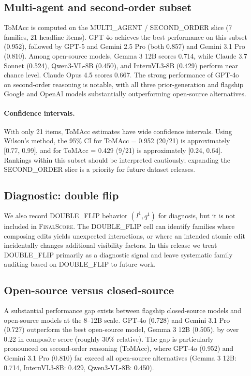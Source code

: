 \documentclass[11pt]{article}
\begin{document}
\subsection{Multi-agent and second-order subset}

ToMAcc is computed on the MULTI\_AGENT / SECOND\_ORDER slice (7 families, 21 headline items). GPT-4o achieves the best performance on this subset (0.952), followed by GPT-5 and Gemini 2.5 Pro (both 0.857) and Gemini 3.1 Pro (0.810). Among open-source models, Gemma 3 12B scores 0.714, while Claude 3.7 Sonnet (0.524), Qwen3-VL-8B (0.450), and InternVL3-8B (0.429) perform near chance level. Claude Opus 4.5 scores 0.667. The strong performance of GPT-4o on second-order reasoning is notable, with all three prior-generation and flagship Google and OpenAI models substantially outperforming open-source alternatives.

\paragraph{Confidence intervals.} With only 21 items, ToMAcc estimates have wide confidence intervals. Using Wilson's method, the 95\% CI for ToMAcc = 0.952 (20/21) is approximately [0.77, 0.99], and for ToMAcc = 0.429 (9/21) is approximately [0.24, 0.64]. Rankings within this subset should be interpreted cautiously; expanding the SECOND\_ORDER slice is a priority for future dataset releases.

\subsection{Diagnostic: double flip}

We also record DOUBLE\_FLIP behavior \((I^1,q^1)\) for diagnosis, but it is not included in \textsc{FinalScore}. The DOUBLE\_FLIP cell can identify families where composing edits yields unexpected interactions, or where an intended atomic edit incidentally changes additional visibility factors. In this release we treat DOUBLE\_FLIP primarily as a diagnostic signal and leave systematic family auditing based on DOUBLE\_FLIP to future work.

\subsection{Open-source versus closed-source}

A substantial performance gap exists between flagship closed-source models and open-source models at the 8--12B scale. GPT-4o (0.728) and Gemini 3.1 Pro (0.727) outperform the best open-source model, Gemma 3 12B (0.505), by over 0.22 in composite score (roughly 30\% relative). The gap is particularly pronounced on second-order reasoning (ToMAcc), where GPT-4o (0.952) and Gemini 3.1 Pro (0.810) far exceed all open-source alternatives (Gemma 3 12B: 0.714, InternVL3-8B: 0.429, Qwen3-VL-8B: 0.450).
\end{document}

